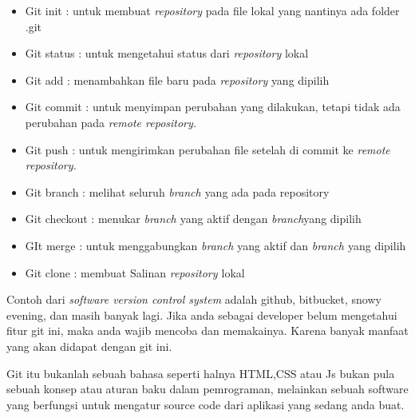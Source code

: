 \begin{itemize}
\item Git init : untuk membuat $  $\textit{repository} $  $pada file lokal yang nantinya ada folder .git \par
\noindent 
\item Git status : untuk mengetahui status dari $  $\textit{repository} $  $lokal \par
\noindent 
\item Git add : menambahkan file baru pada $  $\textit{repository} $  $yang dipilih \par
\noindent 
\item Git commit : untuk menyimpan perubahan yang dilakukan, tetapi tidak ada perubahan pada $  $\textit{remote repository.} \par
\noindent 
\item Git push : untuk mengirimkan perubahan file setelah di commit ke $  $\textit{remote repository.} \par
\noindent 
\item Git branch : melihat seluruh $  $\textit{branch $  $}yang ada pada repository \par
\noindent 
\item Git checkout : menukar $  $\textit{branch $  $}yang aktif dengan $  $\textit{branch}yang dipilih \par
\noindent 
\item GIt merge : untuk menggabungkan $  $\textit{branch $  $}yang aktif dan $  $\textit{branch $  $}yang dipilih \par
\noindent 
\item Git clone : membuat Salinan $  $\textit{repository $  $}lokal\end{itemize}
 \par
\vspace{12pt}
\noindent 
Contoh dari $  $\textit{software version control system} $  $adalah github, bitbucket, snowy evening, dan masih banyak lagi. Jika anda sebagai developer belum mengetahui fitur git ini, maka anda wajib mencoba dan memakainya. Karena banyak manfaat yang akan didapat dengan git ini. \par
\vspace{12pt}
\noindent 
Git itu bukanlah sebuah bahasa seperti halnya HTML,CSS atau Js bukan pula sebuah konsep atau aturan baku dalam pemrograman, melainkan sebuah software yang berfungsi untuk mengatur source code dari aplikasi yang sedang anda buat. \par
\vspace{12pt}
